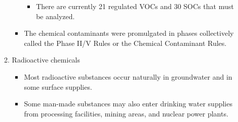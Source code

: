 \begin{itemize}
\begin{enumerate}
\begin{itemize}
\begin{itemize}
\item There are currently 21 regulated VOCs and 30 SOCs that must be analyzed.
\end{itemize}
\item The chemical contaminants were promulgated in phases collectively called the Phase II/V Rules or the Chemical Contaminant Rules.
\end{itemize}
\item Radioactive chemicals
\begin{itemize}
\item Most radioactive substances occur naturally in groundwater and in some surface supplies. 
\item Some man-made substances may also enter drinking water supplies from processing facilities, mining areas, and nuclear power plants. 
\end{itemize}


\end{enumerate}
\end{itemize}

